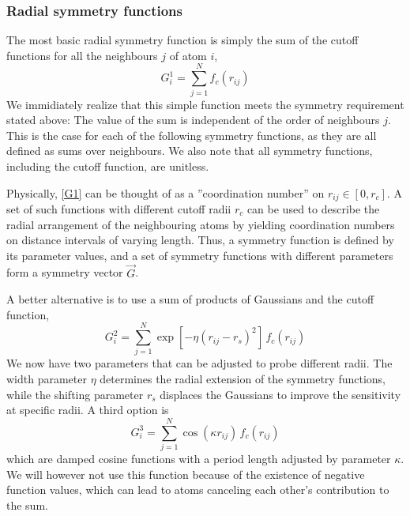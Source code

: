 \documentclass[twoside,english]{uiofysmaster}
\begin{document}
\subsubsection{Radial symmetry functions}
The most basic radial symmetry function is simply the sum of the cutoff functions for all the neighbours $j$ of 
atom $i$,
\begin{equation}
 G_i^1 = \sum_{j=1}^N f_c(r_{ij})
 \label{G1}
\end{equation}
We immidiately realize that this simple function meets the symmetry requirement stated above: The value 
of the sum is independent of the order of neighbours $j$. This is the case for each of the following symmetry functions, as they 
are all defined as sums over neighbours. We also note that all symmetry functions, including the cutoff function, 
are unitless. 

Physically, \eqref{G1} can be thought of as a ''coordination number'' on $r_{ij} \in [0,r_c]$.
A set of such functions with different cutoff radii $r_c$ can be used to describe the radial arrangement of the neighbouring atoms by
yielding coordination numbers on distance intervals of varying length. Thus, a symmetry function is defined by 
its parameter values, 
and a set of symmetry functions with different parameters form a symmetry vector $\vec{G}$. 

A better alternative is to use a sum of products of Gaussians and the cutoff function, 
\begin{equation}
 G_i^2 = \sum_{j=1}^N \exp[-\eta(r_{ij}-r_s)^2] \,f_c(r_{ij})
 \label{G2}
\end{equation}
We now have two parameters that can be adjusted to probe different radii. The width parameter $\eta$ determines the 
radial extension of the symmetry functions, while the shifting parameter $r_s$ displaces the Gaussians to improve
the sensitivity at specific radii. A third option is 
\begin{equation}
 G_i^3 = \sum_{j=1}^N \cos(\kappa r_{ij}) \, f_c(r_{ij})
 \label{G3}
\end{equation}
which are damped cosine functions with a period length adjusted by parameter $\kappa$. We will however not use 
this function because of the existence of negative function values, which can lead to atoms canceling each other's
contribution to the sum. 
\end{document}
